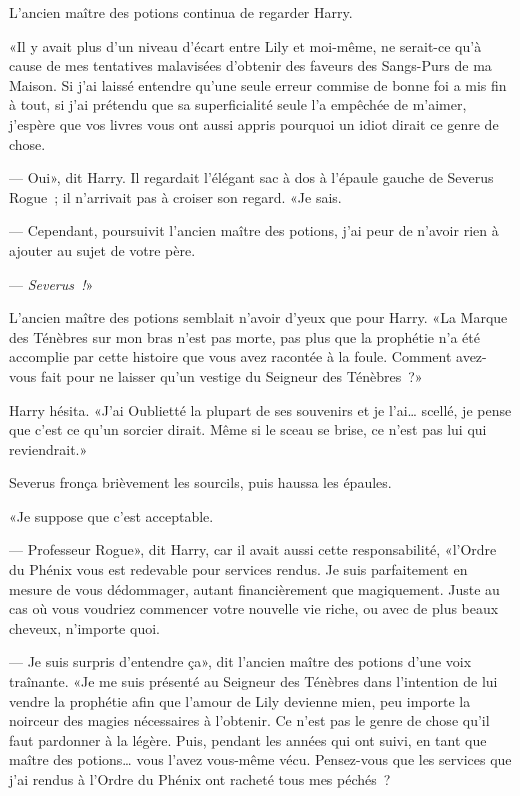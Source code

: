 L'ancien maître des potions continua de regarder Harry.

«Il y avait plus d'un niveau d'écart entre Lily et moi-même, ne serait-ce qu'à cause de mes tentatives malavisées d'obtenir des faveurs des Sangs-Purs de ma Maison. Si j'ai laissé entendre qu'une seule erreur commise de bonne foi a mis fin à tout, si j'ai prétendu que sa superficialité seule l'a empêchée de m'aimer, j'espère que vos livres vous ont aussi appris pourquoi un idiot dirait ce genre de chose.

--- Oui», dit Harry. Il regardait l'élégant sac à dos à l'épaule gauche de Severus Rogue~; il n'arrivait pas à croiser son regard. «Je sais.

--- Cependant, poursuivit l'ancien maître des potions, j'ai peur de n'avoir rien à ajouter au sujet de votre père.

--- \emph{Severus~!}»

L'ancien maître des potions semblait n'avoir d'yeux que pour Harry. «La Marque des Ténèbres sur mon bras n'est pas morte, pas plus que la prophétie n'a été accomplie par cette histoire que vous avez racontée à la foule. Comment avez-vous fait pour ne laisser qu'un vestige du Seigneur des Ténèbres~?»

Harry hésita. «J'ai Oublietté la plupart de ses souvenirs et je l'ai… scellé, je pense que c'est ce qu'un sorcier dirait. Même si le sceau se brise, ce n'est pas lui qui reviendrait.»

Severus fronça brièvement les sourcils, puis haussa les épaules.

«Je suppose que c'est acceptable.

--- Professeur Rogue», dit Harry, car il avait aussi cette responsabilité, «l'Ordre du Phénix vous est redevable pour services rendus. Je suis parfaitement en mesure de vous dédommager, autant financièrement que magiquement. Juste au cas où vous voudriez commencer votre nouvelle vie riche, ou avec de plus beaux cheveux, n'importe quoi.

--- Je suis surpris d'entendre ça», dit l'ancien maître des potions d'une voix traînante. «Je me suis présenté au Seigneur des Ténèbres dans l'intention de lui vendre la prophétie afin que l'amour de Lily devienne mien, peu importe la noirceur des magies nécessaires à l'obtenir. Ce n'est pas le genre de chose qu'il faut pardonner à la légère. Puis, pendant les années qui ont suivi, en tant que maître des potions… vous l'avez vous-même vécu. Pensez-vous que les services que j'ai rendus à l'Ordre du Phénix ont racheté tous mes péchés~?

